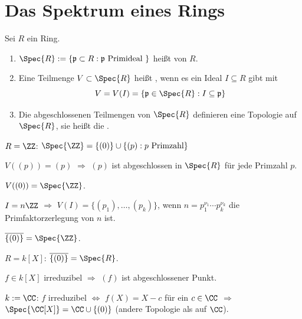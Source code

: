 \section{Das Spektrum eines Rings}

\begin{DefBem}
Sei $R$ ein Ring.

\begin{enumerate}
\item $\Spec{R} := \{ \mathfrak{p} \subset R : \mathfrak{p} \text{ Primideal } \}$ hei\ss t  von $R$.

\item Eine Teilmenge $V \subset \Spec{R}$ hei\ss t , wenn es ein Ideal $I \subseteq R$ gibt mit
$$V = V(I) = \{ \mathfrak{p} \in \Spec{R} : I \subseteq \mathfrak{p} \}$$

\item Die abgeschlossenen Teilmengen von $\Spec{R}$ definieren eine Topologie auf $\Spec{R}$, sie hei\ss t die .
\end{enumerate}
\end{DefBem}

\begin{nnBsp}
$R = \ZZ$: $\Spec{\ZZ} = \{ (0) \} \cup \{ (p) : p \text{ Primzahl} \}$

$V( (p) ) = (p)$ $\Rightarrow$ $(p)$ ist abgeschlossen in $\Spec{R}$ f\"ur jede Primzahl $p$.

$V( (0) ) = \Spec{\ZZ}$.

$I = n \ZZ$ $\Rightarrow$ $V(I) = \{ (p_1), \ldots, (p_k) \}$, wenn $n = p_1^{\nu_1} \cdots p_k^{\nu_k}$ die Primfaktorzerlegung von $n$ ist.

$\overline{ \{ (0) \} } = \Spec{\ZZ}$.
\bigskip

$R = k[X]$: $\overline{ \{ (0) \} } = \Spec{R}$.

$f \in k[X]$ irreduzibel $\Rightarrow$ $(f)$ ist abgeschlossener Punkt.

$k := \CC$: $f$ irreduzibel $\Leftrightarrow$ $f(X) = X - c$ f\"ur ein $c \in
\CC$ $\Rightarrow$ $\Spec{\CC[X]} = \CC \cup \{ (0) \}$ (andere Topologie als
auf $\CC$).

\end{nnBsp}

